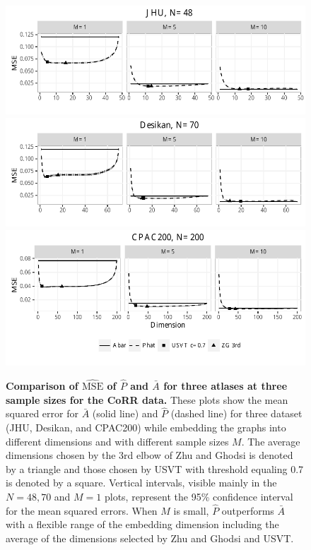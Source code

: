 \documentclass[10pt,letterpaper]{article}
\renewcommand{\hat}{\widehat}
\begin{document}
\begin{figure}[!htb]
\centering
\includegraphics[width=1\textwidth]{corr_data_MSE_jhu.pdf}\\
\includegraphics[width=1\textwidth]{corr_data_MSE_desikan.pdf}\\
\includegraphics[width=1\textwidth]{corr_data_MSE_CPAC200.pdf}
\caption{{\bf Comparison of $\hat{\mathrm{MSE}}$ of $\hat{P}$ and $\bar{A}$ for three atlases at three sample sizes for the CoRR data.}
These plots show the mean squared error for $\bar{A}$ (solid line) and $\hat{P}$ (dashed line) for three dataset (JHU, Desikan, and CPAC200) while embedding the graphs into different dimensions and with different sample sizes $M$. The average dimensions chosen by the 3rd elbow of Zhu and Ghodsi is denoted by a triangle
 and those chosen by USVT with threshold equaling 0.7 is denoted by a square.
 Vertical intervals, visible mainly in the $N=48,70$ and $M=1$ plots, represent the 95\% confidence interval for the mean squared errors.  When $M$ is small, $\hat{P}$ outperforms $\bar{A}$ with a flexible range of the embedding dimension including the average of the dimensions selected by Zhu and Ghodsi and USVT.}
\label{fig:realdata}
\end{figure}
\end{document}
